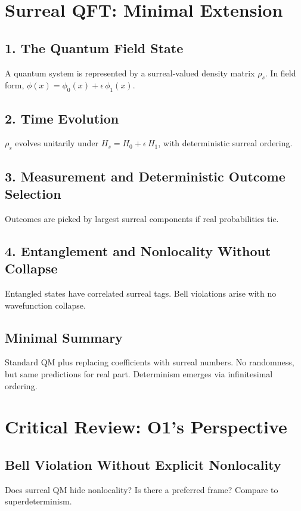 \documentclass{article}
\begin{document}
\section{Surreal QFT: Minimal Extension}
\subsection{1. The Quantum Field State}
A quantum system is represented by a surreal-valued density matrix \(\rho_s\). In field form, \(\phi(x) = \phi_0(x) + \epsilon\,\phi_1(x)\).

\subsection{2. Time Evolution}
\(\rho_s\) evolves unitarily under \(H_s = H_0 + \epsilon\,H_1\), with deterministic surreal ordering.

\subsection{3. Measurement and Deterministic Outcome Selection}
Outcomes are picked by largest surreal components if real probabilities tie.

\subsection{4. Entanglement and Nonlocality Without Collapse}
Entangled states have correlated surreal tags. Bell violations arise with no wavefunction collapse.

\subsection{Minimal Summary}
Standard QM plus replacing coefficients with surreal numbers. No randomness, but same predictions for real part. Determinism emerges via infinitesimal ordering.

\section{Critical Review: O1's Perspective}

\subsection{Bell Violation Without Explicit Nonlocality}
Does surreal QM hide nonlocality? Is there a preferred frame? Compare to superdeterminism.
\end{document}
